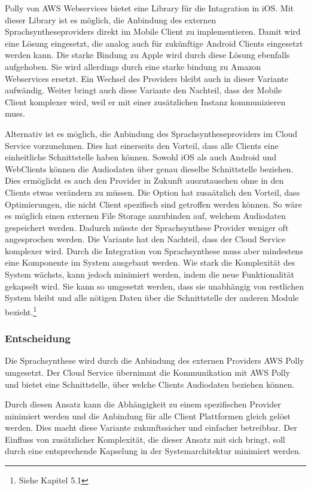 Polly von AWS Webservices bietet eine Library für die Intagration in iOS. \cite{aws_polly_ios}
Mit dieser Library ist es möglich, die Anbindung des externen Sprachsyntheseproviders direkt im Mobile Client zu implementieren.
Damit wird eine Lösung eingesetzt, die analog auch für zukünftige Android Clients eingesetzt werden kann.
Die starke Bindung zu Apple wird durch diese Lösung ebenfalls aufgehoben.
Sie wird allerdings durch eine starke bindung zu Amazon Webservices ersetzt.
Ein Wechsel des Providers bleibt auch in dieser Variante aufwändig.
Weiter bringt auch diese Variante den Nachteil, dass der Mobile Client komplexer wird, weil er mit einer zusätzlichen Instanz kommunizieren muss.

\clearpage

Alternativ ist es möglich, die Anbindung des Sprachsyntheseproviders im Cloud Service vorzunehmen.
Dies hat einerseits den Vorteil, dass alle Clients eine einheitliche Schnittstelle haben können.
Sowohl iOS als auch Android und WebClients können die Audiodaten über genau dieselbe Schnittstelle beziehen.
Dies ermöglicht es auch den Provider in Zukunft auszutauschen ohne in den Clients etwas verändern zu müssen.
Die Option hat zusaätzlich den Vorteil, dass Optimierungen, die nicht Client spezifisch sind getroffen werden können.
So wäre es möglich einen externen File Storage anzubinden auf, welchem Audiodaten gespeichert werden.
Dadurch müsste der Sprachsynthese Provider weniger oft angesprochen werden.
Die Variante hat den Nachteil, dass der Cloud Service komplexer wird.
Durch die Integration von Sprachsynthese muss aber mindestens eine Komponente im System ausgebaut werden.
Wie stark die Komplexität des System wächsts, kann jedoch minimiert werden, indem die neue Funktionalität gekapselt wird.
Sie kann so umgesetzt werden, dass sie unabhängig von restlichen System bleibt und alle nötigen Daten über die Schnittstelle der anderen Module bezieht.\footnote{Siehe Kapitel 5.1}

\subsubsection*{Entscheidung}

Die Sprachsynthese wird durch die Anbindung des externen Providers AWS Polly umgesetzt.
Der Cloud Service übernimmt die Kommunikation mit AWS Polly und bietet eine Schnittstelle, über welche Clients Audiodaten beziehen können.

Durch diesen Ansatz kann die Abhängigkeit zu einem spezifischen Provider minimiert werden und die Anbindung für alle Client Plattformen gleich gelöst werden.
Dies macht diese Variante zukunftssicher und einfacher betreibbar.
Der Einfluss von zusätzlicher Komplexität, die dieser Ansatz mit sich bringt, soll durch eine entsprechende Kapselung in der Systemarchitektur minimiert werden.

\clearpage
